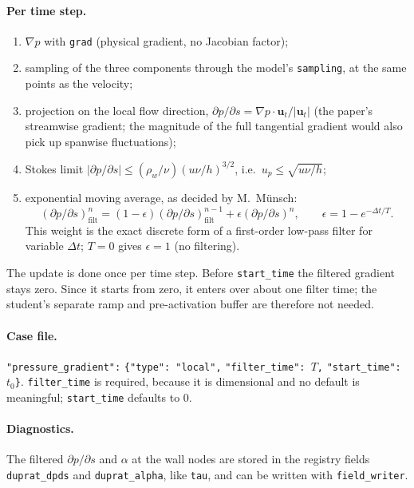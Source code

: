 \documentclass[11pt,a4paper]{article}
\newcommand{\code}[1]{\texttt{#1}}
\newcommand{\up}{u_p}
\newcommand{\dpds}{\partial p/\partial s}
\begin{document}
\paragraph{Per time step.}
\begin{enumerate}
  \item $\nabla p$ with \code{grad} (physical gradient, no Jacobian factor);
  \item sampling of the three components through the model's
    \code{sampling}, at the same points as the velocity;
  \item projection on the local flow direction,
    $\dpds = \nabla p\cdot\mathbf{u}_t/|\mathbf{u}_t|$ (the paper's
    streamwise gradient; the magnitude of the full tangential gradient
    would also pick up spanwise fluctuations);
  \item Stokes limit $|\dpds| \le (\rho_w/\nu)(u\nu/h)^{3/2}$, i.e.\
    $\up \le \sqrt{u\nu/h}$;
  \item exponential moving average, as decided by M.~Münsch:
    \begin{equation}
      \left(\dpds\right)_{\mathrm{filt}}^{n} =
        (1-\epsilon)\left(\dpds\right)_{\mathrm{filt}}^{n-1}
        + \epsilon\left(\dpds\right)^{n},
      \qquad \epsilon = 1 - e^{-\Delta t/T}.
      \label{eq:ema}
    \end{equation}
    This weight is the exact discrete form of a first-order low-pass filter
    for variable $\Delta t$; $T = 0$ gives $\epsilon = 1$ (no filtering).
\end{enumerate}

\noindent The update is done once per time step. Before \code{start\_time}
the filtered gradient stays zero. Since it starts from zero, it enters over
about one filter time; the student's separate ramp and pre-activation
buffer are therefore not needed.

\paragraph{Case file.}
{\sloppy
\code{"pressure\_gradient":} \code{\{"type": "local",} \code{"filter\_time": $T$,}
\code{"start\_time": $t_0$\}}. \code{filter\_time} is
required, because it is dimensional and no default is meaningful;
\code{start\_time} defaults to 0.\par}

\paragraph{Diagnostics.} The filtered $\dpds$ and $\alpha$ at the wall
nodes are stored in the registry fields \code{duprat\_dpds} and
\code{duprat\_alpha}, like \code{tau}, and can be written with
\code{field\_writer}.
\end{document}
